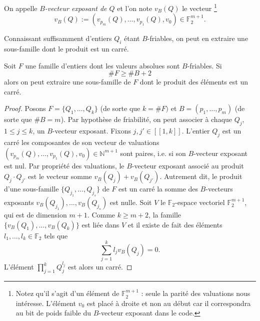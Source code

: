\begin{definition}
	On appelle \emph{$B$-vecteur exposant de $Q$} et l'on note $v_B(Q)$ le
	vecteur \footnote{Notez qu'il s'agit d'un élément de $\mathbb{F}_2^{m+1}$ :
	seule la parité des valuations nous intéresse. L'élément $v_0$ est placé à
	droite et non au début car il correspondra au bit de poids faible du
	$B$-vecteur exposant dans le code.} \[v_B(Q) := (v_{p_m}(Q), \dots,
	v_{p_1}(Q), v_0 ) \in \mathbb{F}_2^{m+1}.\] 
\end{definition}

Connaissant suffisamment d'entiers $Q_i$ étant $B$-friables, on peut en
extraire une sous-famille dont le produit est un carré.

\begin{proposition}
	Soit $F$ une famille d'entiers dont les valeurs absolues sont $B$-friables.
	Si \[\# F \geqslant \# B + 2\] alors on peut extraire une sous-famille de
	$F$ dont le produit des éléments est un carré.
\end{proposition}

\begin{proof}
	Posons $F = \{Q_1, \dots, Q_k\}$ (de sorte que $k = \# F)$ et $B = (p_1,
	\dots, p_m)$ (de sorte que $\# B = m$). Par hypothèse de friabilité, on
	peut associer à chaque $Q_j$, $1\leqslant j \leqslant k$, un $B$-vecteur
	exposant. Fixons $j, j'\in [\![1,k]\!]$. L'entier $Q_j$ est un carré \ssi
	les composantes de son vecteur de valuations $(v_{p_m}(Q), \dots,
	v_{p_1}(Q), v_0 ) \in \mathbb{N}^{m+1}$ sont paires, i.e. si son
	$B$-vecteur exposant est nul. Par propriété des valuations, le $B$-vecteur
	exposant associé au produit $Q_j\cdot Q_{j'}$ est le vecteur somme
	$v_B(Q_j) + v_B(Q_{j'})$. Autrement dit, le produit d'une sous-famille
	$\{Q_{j_1}, \dots, Q_{j_s}\}$ de $F$ est un carré \ssi la somme des
	$B$-vecteurs exposants $v_B(Q_{j_1}), \dots, v_B(Q_{j_s})$ est nulle. Soit
	$V$ le $\mathbb{F}_2$-espace vectoriel $\mathbb{F}_2^{m+1}$, qui est de
	dimension $m+1$. Comme $k\geqslant m+2$, la famille $\{v_B(Q_1), \dots,
	v_B(Q_k)\}$ est liée dans $V$ et il existe de fait des éléments $l_1,\dots,
	l_k\in \mathbb{F}_2$ tels que \[\sum_{j=1}^k l_j v_B(Q_j) = 0.\] L'élément
	$\prod_{j=1}^k Q_j^{l_j}$ est alors un carré.
\end{proof}

